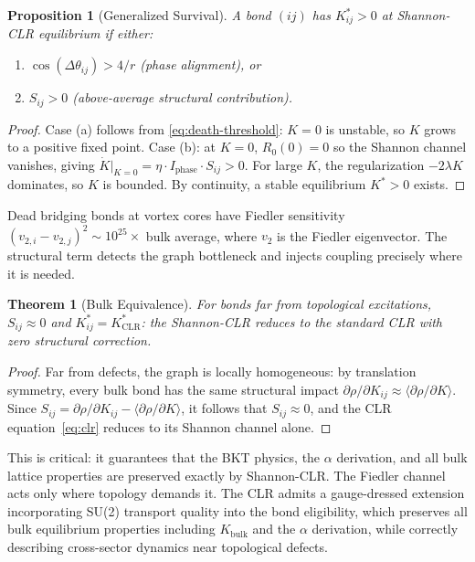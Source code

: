\documentclass[aps,prd,onecolumn,superscriptaddress,floatfix,12pt]{revtex4-2}
\newcommand{\Rzero}{R_0}
\newcommand{\Kbulk}{K_{\text{bulk}}}
\newcommand{\Iphase}{I_{\text{phase}}}
\newtheorem{theorem}{Theorem}[section]
\newtheorem{proposition}{Proposition}[section]
\begin{document}
\begin{proposition}[Generalized Survival]\label{prop:survival}
A bond $(ij)$ has $K^*_{ij} > 0$ at Shannon-CLR equilibrium if either:
\begin{enumerate}
\item[(a)] $\cos(\Delta\theta_{ij}) > 4/r$ \emph{(phase alignment)}, or
\item[(b)] $S_{ij} > 0$ \emph{(above-average structural contribution)}.
\end{enumerate}
\end{proposition}

\begin{proof}
Case (a) follows from \eqref{eq:death-threshold}: $K = 0$ is unstable, so $K$ grows to a positive fixed point. Case (b): at $K = 0$, $\Rzero(0) = 0$ so the Shannon channel vanishes, giving $\dot{K}|_{K=0} = \eta \cdot \Iphase \cdot S_{ij} > 0$. For large $K$, the regularization $-2\lambda K$ dominates, so $K$ is bounded. By continuity, a stable equilibrium $K^* > 0$ exists.
\end{proof}

Dead bridging bonds at vortex cores have Fiedler sensitivity $(v_{2,i} - v_{2,j})^2 \sim 10^{25}\times$ bulk average, where $v_2$ is the Fiedler eigenvector. The structural term detects the graph bottleneck and injects coupling precisely where it is needed.

\begin{theorem}[Bulk Equivalence]\label{thm:bulk-equiv}
For bonds far from topological excitations, $S_{ij} \approx 0$ and $K^*_{ij} = K^*_{\text{CLR}}$:
the Shannon-CLR reduces to the standard CLR with zero structural correction.
\end{theorem}

\begin{proof}
Far from defects, the graph is locally homogeneous: by translation symmetry, every bulk bond has the same structural impact $\partial\rho/\partial K_{ij} \approx \langle\partial\rho/\partial K\rangle$. Since $S_{ij} = \partial\rho/\partial K_{ij} - \langle\partial\rho/\partial K\rangle$, it follows that $S_{ij} \approx 0$, and the CLR equation~\eqref{eq:clr} reduces to its Shannon channel alone.
\end{proof}

This is critical: it guarantees that the BKT physics, the $\alpha$ derivation, and all bulk lattice properties are preserved exactly by Shannon-CLR. The Fiedler channel acts only where topology demands it. The CLR admits a gauge-dressed extension incorporating SU(2) transport quality into the bond eligibility, which preserves all bulk equilibrium properties including $\Kbulk$ and the $\alpha$ derivation, while correctly describing cross-sector dynamics near topological defects.
\end{document}
